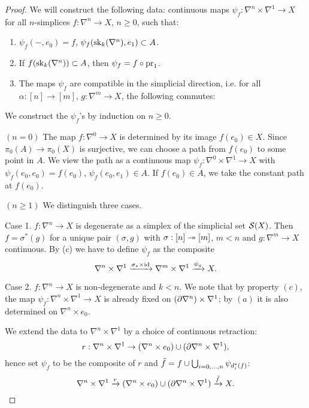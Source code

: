 \begin{proof}
We will construct the following data: continuous maps $\psi_f:\nabla^n\times\nabla^1\to X$ for all $n$-simplices $f:\nabla^n\to X$, $n\geq 0$, such that:
\begin{enumerate}[label={(\alph*)}]
    \item $\psi_f(-,e_0)=f$, $\psi_f(\sk_k(\ns),e_1)\subset A$.
    \item If $f(\sk_k(\ns))\subset A$, then $\psi_f=f\circ\pr_1$.
    \item The maps $\psi_f$ are compatible in the simplicial direction, i.e. for all $\alpha:[n]\to[m]$, $g:\nabla^m\to X$, the following commutes:
    \begin{center}
    \end{center}
\end{enumerate}

We construct the $\psi_f$'s by induction on $n\geq0$.

$(n=0)$ The map $f:\nabla^0\to X$ is determined by its image $f(e_0)\in X$. Since $\pi_0(A)\to\pi_0(X)$ is surjective, we can choose a path from $f(e_0)$ to some point in $A$. We view the path as a continuous map $\psi_f:\nabla^0\times\nabla^1\to X$ with $\psi_f(e_0,e_0)=f(e_0)$, $\psi_f(e_0,e_1)\in A$. If $f(e_0)\in A$, we take the constant path at $f(e_0)$.

$(n\geq1)$ We distinguish three cases.

Case 1. $f:\nabla^n\to X$ is degenerate as a simplex of the simplicial set $\S(X)$. Then $f=\sigma^*(g)$ for a unique pair $(\sigma,g)$ with $\sigma:[n]\onto[m]$, $m<n$ and $g:\nabla^m\to X$ continuous. By (c) we have to define $\psi_f$ as the composite
\[\nabla^n\times\nabla^1\xto{\sigma_*\times\id}\nabla^m\times\nabla^1\xto{\psi_g} X.\]

Case 2. $f:\nabla^n\to X$ is non-degenerate and $k<n$. We note that by property $(c)$, the map $\psi_f:\nabla^n\times\nabla^1\to X$ is already fixed on $(\de\nabla^n)\times\nabla^1$; by $(a)$ it is also determined on $\nabla^n\times e_0$.

We extend the data to $\nabla^n\times\nabla^1$ by a choice of continuous retraction:
\[r:\nabla^n\times\nabla^1\to (\nabla^n\times e_0)\cup(\de\nabla^n\times\nabla^1),\]
hence set $\psi_f$ to be the composite of $r$ and $\til f=f\cup\bigcup_{i=0,\dots,n}\psi_{d_i^*(f)}$\normalmarginpar{}:
\[\ns\times\sx{1}\xto{r}(\nabla^n\times e_0)\cup(\de\nabla^n\times\nabla^1)\xto{\til f} X.\]


\end{proof}
